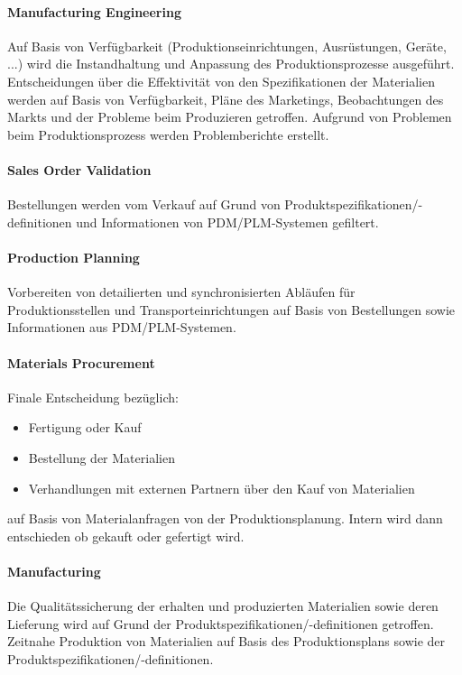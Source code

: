 \paragraph{Manufacturing Engineering}
Auf Basis von Verfügbarkeit (Produktionseinrichtungen, Ausrüstungen, Geräte, ...) wird die Instandhaltung und Anpassung des Produktionsprozesse ausgeführt. Entscheidungen über die Effektivität von den Spezifikationen der Materialien werden auf Basis von Verfügbarkeit, Pläne des Marketings, Beobachtungen des Markts und der Probleme beim Produzieren getroffen. Aufgrund von Problemen beim Produktionsprozess werden Problemberichte erstellt.

\paragraph{Sales Order Validation}
Bestellungen werden vom Verkauf auf Grund von Produktspezifikationen/-definitionen und Informationen von PDM/PLM-Systemen gefiltert.

\paragraph{Production Planning}
Vorbereiten von detailierten und synchronisierten Abläufen für Produktionsstellen und Transporteinrichtungen auf Basis von Bestellungen sowie Informationen aus PDM/PLM-Systemen.

\paragraph{Materials Procurement}
Finale Entscheidung bezüglich:
\begin{itemize}
\item Fertigung oder Kauf 
\item Bestellung der Materialien
\item Verhandlungen mit externen Partnern über den Kauf von Materialien
\end{itemize}
auf Basis von Materialanfragen von der Produktionsplanung. Intern wird dann entschieden ob gekauft oder gefertigt wird.

\paragraph{Manufacturing}
Die Qualitätssicherung der erhalten und produzierten Materialien sowie deren Lieferung wird auf Grund der Produktspezifikationen/-definitionen getroffen. Zeitnahe Produktion von Materialien auf Basis des Produktionsplans sowie der Produktspezifikationen/-definitionen. 

